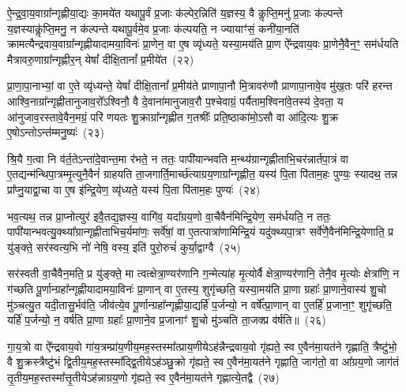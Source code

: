{\anuvakamend[{तस्मा᳚द्गाय॒त्र्येका॒न्नप॑ञ्चा॒शच्च॑}]}%

ऐ॒न्द्र॒वा॒य॒वाग्रा᳚न्गृह्णीया॒द्यः का॒मये॑त यथापू॒र्वं प्र॒जाः क॑ल्पेर॒न्निति॑ य॒ज्ञस्य॒ वै कॢप्ति॒मनु॑ प्र॒जाः क॑ल्पन्ते य॒ज्ञस्याकॢ॑प्ति॒मनु॒ न क॑ल्पन्ते यथापू॒र्वमे॒व प्र॒जाः क॑ल्पयति॒ न ज्यायाꣳ॑सं॒ कनी॑या॒नति॑ क्रामत्यैन्द्रवाय॒वाग्रा᳚न्गृह्णीयादामया॒विनः॑ प्रा॒णेन॒ वा ए॒ष व्यृ॑ध्यते॒ यस्या॒मय॑ति प्रा॒ण ऐ᳚न्द्रवाय॒वः प्रा॒णेनै॒वैन॒ꣳ॒ सम॑र्धयति मैत्रावरु॒णाग्रा᳚न्गृह्णीर॒न् येषां᳚ दीक्षि॒तानां᳚ प्र॒मीये॑त~(२२)

प्रा॒णा॒पा॒नाभ्यां॒ वा ए॒ते व्यृ॑ध्यन्ते॒ येषां᳚ दीक्षि॒तानां᳚ प्र॒मीय॑ते प्राणापा॒नौ मि॒त्रावरु॑णौ प्राणापा॒नावे॒व मु॑ख॒तः परि॑ हरन्त आश्वि॒नाग्रा᳚न्गृह्णीतानुजाव॒रो᳚\-ऽश्विनौ॒ वै दे॒वाना॑मानुजाव॒रौ प॒श्चेवाग्रं॒ पर्यैताम॒श्विना॑वे॒तस्य॑ दे॒वता॒ य आ॑नुजाव॒रस्तावे॒वैन॒मग्रं॒ परि॑ णयतः शु॒क्राग्रा᳚न्गृह्णीत ग॒तश्रीः᳚ प्रति॒ष्ठाका॑मो॒\-ऽसौ वा आ॑दि॒त्यः शु॒क्र ए॒षो\-ऽन्तो\-ऽन्त॑म्मनु॒ष्यः॑~(२३)

श्रि॒यै ग॒त्वा नि व॑र्त॒ते\-ऽन्ता॑दे॒वान्त॒मा र॑भते॒ न ततः॒ पापी॑यान्भवति म॒न्थ्य॑ग्रान्गृह्णीताभि॒चर॑न्नार्तपा॒त्रं वा ए॒तद्यन्म॑न्थिपा॒त्रम्मृ॒त्युनै॒वैनं॑ ग्राहयति ता॒जगार्ति॒मार्च्छ॑त्याग्रय॒णाग्रा᳚न्गृह्णीत॒ यस्य॑ पि॒ता पि॑ताम॒हः पुण्यः॒ स्यादथ॒ तन्न प्रा᳚प्नु॒याद्वा॒चा वा ए॒ष इ॑न्द्रि॒येण॒ व्यृ॑ध्यते॒ यस्य॑ पि॒ता पि॑ताम॒हः पुण्यः॑~(२४)

भव॒त्यथ॒ तन्न प्रा॒प्नोत्युर॑ इवै॒तद्य॒ज्ञस्य॒ वागि॑व॒ यदा᳚ग्रय॒णो वा॒चैवैन॑मिन्द्रि॒येण॒ सम॑र्धयति॒ न ततः॒ पापी॑यान्भव\-त्यु॒क्थ्या᳚ग्रान्गृह्णीताभिच॒र्यमा॑णः॒ सर्वे॑षां॒ वा ए॒तत्पात्रा॑णामिन्द्रि॒यं यदु॑क्थ्यपा॒त्रꣳ सर्वे॑णै॒वैन॑मिन्द्रि॒येणाति॒ प्र यु॑ङ्क्ते॒ सर॑स्वत्य॒भि नो॑ नेषि॒ वस्य॒ इति॑ पुरो॒रुचं॑ कुर्या॒द्वाग्वै~(२५)

सर॑स्वती वा॒चैवैन॒मति॒ प्र यु॑ङ्क्ते॒ मा त्वत्क्षेत्रा॒ण्यर॑णानि ग॒न्मेत्या॑ह मृ॒त्योर्वै क्षेत्रा॒ण्यर॑णानि॒ तेनै॒व मृ॒त्योः क्षेत्रा॑णि॒ न ग॑च्छति पू॒र्णान्ग्रहा᳚न्गृह्णीयादामया॒विनः॑ प्रा॒णान् वा ए॒तस्य॒ शुगृ॑च्छति॒ यस्या॒मय॑ति प्रा॒णा ग्रहाः᳚ प्रा॒णाने॒वास्य॑ शु॒चो मु॑ञ्चत्यु॒त यदी॒तासु॒र्भव॑ति॒ जीव॑त्ये॒व पू॒र्णान्ग्रहा᳚न्गृह्णीया॒द्यर्\mbox{}हि॑ प॒र्जन्यो॒ न वर्\mbox{}षे᳚त्प्रा॒णान् वा ए॒तर्\mbox{}हि॑ प्र॒जाना॒ꣳ॒ शुगृ॑च्छति॒ यर्\mbox{}हि॑ प॒र्जन्यो॒ न॒ वर्\mbox{}ष॑ति प्रा॒णा ग्रहाः᳚ प्रा॒णाने॒व प्र॒जानाꣳ॑ शु॒चो मु॑ञ्चति ता॒जक्प्र व॑र्\mbox{}षति॥~(२६)

{\anuvakamend[{प्र॒मीये॑त मनु॒ष्य॑ ऋध्यते॒ यस्य॑ पि॒ता पि॑ताम॒हः पुण्यो॒ वाग्वा ए॒व पू॒र्णान्ग्रहा॒न्पञ्च॑विꣳशतिश्च}]}%

गा॒य॒त्रो वा ऐ᳚न्द्रवाय॒वो गा॑य॒त्रम्प्रा॑य॒णीय॒मह॒स्तस्मा᳚त्प्राय॒णीये\-ऽह॑न्नैन्द्रवाय॒वो गृ॑ह्यते॒ स्व ए॒वैन॑मा॒यत॑ने गृह्णाति॒ त्रैष्टु॑भो॒ वै शु॒क्रस्त्रैष्टु॑भं द्वि॒तीय॒मह॒स्तस्मा᳚द्द्वि॒तीये\-ऽह॑ञ्छु॒क्रो गृ॑ह्यते॒ स्व ए॒वैन॑मा॒यत॑ने गृह्णाति॒ जाग॑तो॒ वा आ᳚ग्रय॒णो जाग॑तं तृ॒तीय॒मह॒स्तस्मा᳚त्तृ॒तीये\-ऽह॑न्नाग्रय॒णो गृ॑ह्यते॒ स्व ए॒वैन॑मा॒यत॑ने गृह्णात्ये॒तद्वै~(२७)

